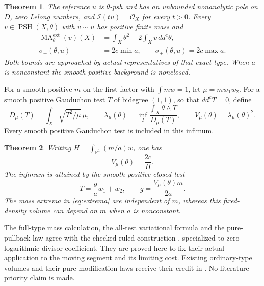 \documentclass[11pt]{article}
\newtheorem{theorem}{Theorem}
\newcommand{\ddc}{dd^c}
\newcommand{\PSH}{\operatorname{PSH}}
\newcommand{\MA}{\operatorname{MA}}
\newcommand{\ext}{\mathrm{ext}}
\newcommand{\PP}{\mathbb P}
\begin{document}
\begin{theorem}\label{thm:mass}
The reference $u$ is $\theta$-psh and has an unbounded nonanalytic pole on
$D$, zero Lelong numbers, and $\mathcal I(tu)=\mathcal O_X$ for every $t>0$.
Every $v\in\PSH(X,\theta)$ with $v\sim u$ has positive finite mass and
\begin{align}
 \MA^{\ext}_\theta(v)(X)
     &=\int_X\theta^2+2\int_Xv\,\ddc\theta,\label{eq:linear-mass}\\
 \sigma_-(\theta,u)&=2c\min a,\qquad
 \sigma_+(\theta,u)=2c\max a.\label{eq:extrema}
\end{align}
Both bounds are approached by actual representatives of that exact type.
When $a$ is nonconstant the smooth positive background is nonclosed.
\end{theorem}

For a smooth positive $m$ on the first factor with $\int m w=1$, let
$\mu=mw_1w_2$. For a smooth positive Gauduchon test $T$ of bidegree $(1,1)$,
so that $\ddc T=0$, define
\[
 D_\mu(T)=\int_X\sqrt{T^2/\mu}\,\mu,\qquad
 \lambda_\mu(\theta)=\inf_T\frac{\int_X\theta\wedge T}{D_\mu(T)},
 \qquad V_\mu(\theta)=\lambda_\mu(\theta)^2.
\]
Every smooth positive Gauduchon test is included in this infimum.

\begin{theorem}\label{thm:dual}
Writing $H=\int_{\PP^1}(m/a)w$, one has
\[
 V_\mu(\theta)=\frac{2c}{H}.
\]
The infimum is attained by the smooth positive closed test
\[
 T=\frac ga w_1+w_2,\qquad g=\frac{V_\mu(\theta)m}{2a}.
\]
The mass extrema in \eqref{eq:extrema} are independent of $m$, whereas
this fixed-density volume can depend on $m$ when $a$ is nonconstant.
\end{theorem}

The full-type mass calculation, the all-test variational formula and the
pure-pullback law agree with the checked ruled construction
\cite{Ruled}, specialized to zero logarithmic divisor coefficient.
They are proved here to fix their actual application to the moving
segment and its limiting cost. Existing ordinary-type volumes and their
pure-modification laws receive their credit in \cite{BGL}.
No literature-priority claim is made.
\end{document}
